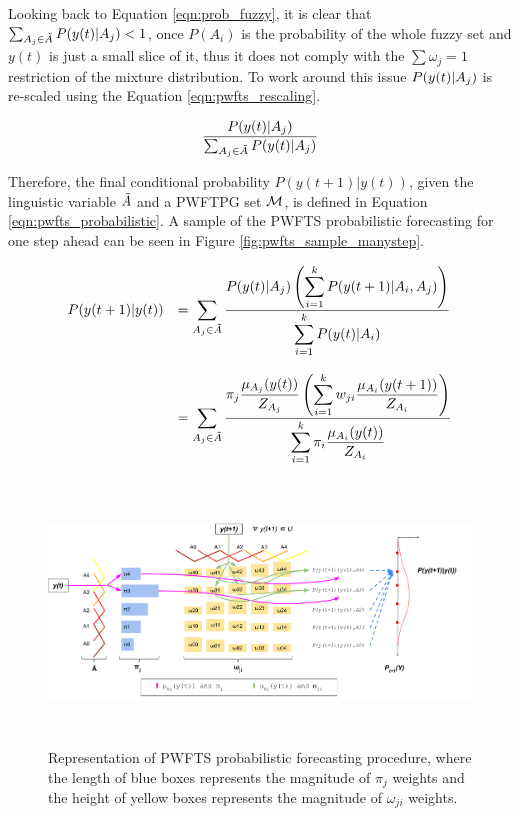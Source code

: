 Looking back to Equation \ref{eqn:prob_fuzzy}, it is clear that $\sum_{A_j \in  \tilde{A}} P(y(t)|A_j) < 1$, once $P(A_i)$ is the probability of the whole fuzzy set and $y(t)$ is just a small slice of it, thus it does not comply with the $\sum \omega_j = 1$ restriction of the mixture distribution. To work around this issue $P(y(t)|A_j)$ is re-scaled using the Equation \ref{eqn:pwfts_rescaling}.

\begin{equation}
\frac{P(y(t)|A_j)}{\sum_{A_j \in \tilde{A}} P(y(t)|A_j)}      
\label{eqn:pwfts_rescaling}
\end{equation}

Therefore, the final conditional probability $P(y(t+1) | y(t))$,  given the linguistic variable $\tilde{A}$ and a PWFTPG set $\mathcal{M}$, is defined in Equation \ref{eqn:pwfts_probabilistic}. A sample of the PWFTS probabilistic forecasting for one step ahead can be seen in Figure \ref{fig:pwfts_sample_manystep}.

\begin{equation}
\begin{array}{cl}
P(y(t+1) | y(t)) &=  \displaystyle \sum_{A_j \in  \tilde{A}}\frac{\displaystyle P(y(t)| A_j) \left( \sum_{i = 1}^k  P(y(t+1) | A_i,A_j) \right)}{\displaystyle \sum_{i = 1}^k P(y(t)| A_i)}  \\
& \\
 &= \displaystyle \sum_{A_j \in  \tilde{A}} \frac{ \displaystyle  \pi_j\frac{\mu_{A_j}(y(t))}{Z_{A_j}} \left( \sum_{i = 1}^k  w_{ji}\frac{\mu_{A_i}(y(t+1))}{Z_{A_i}} \right)}{\displaystyle \sum_{i = 1}^k \pi_i\frac{\mu_{A_i}(y(t))}{Z_{A_i}}}
\end{array}
\label{eqn:pwfts_probabilistic}
\end{equation}

\begin{figure}
    \centering
    \includegraphics[width=\textwidth,height=7cm]{figures/pwfts_probabilistic_forecasting.pdf}
    \caption{Representation of PWFTS probabilistic forecasting procedure, where the length of blue boxes represents the magnitude of $\pi_j$ weights and the height of yellow boxes represents the magnitude of $\omega_{ji}$ weights.}
    \label{fig:pwfts_probabilistic_forecasting}
\end{figure}

